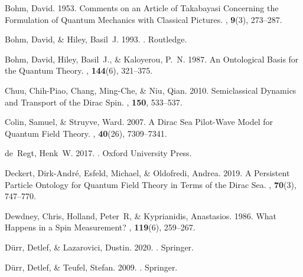 \documentclass[12pt,secnumarabic,amsmath,amssymb,balancelastpage,nofootinbib]{article}
\begin{document}
\begin{thebibliography}{}
Bohm, David. 1953.
\newblock Comments on an Article of Takabayasi Concerning the Formulation of
  Quantum Mechanics with Classical Pictures.
, {\bf 9}(3), 273--287.

Bohm, David, \& Hiley, Basil~J. 1993.
.
\newblock Routledge.

Bohm, David, Hiley, Basil~J., \& Kaloyerou, P.~N. 1987.
\newblock An Ontological Basis for the Quantum Theory.
, {\bf 144}(6), 321--375.

Chuu, Chih-Piao, Chang, Ming-Che, \& Niu, Qian. 2010.
\newblock Semiclassical Dynamics and Transport of the Dirac Spin.
, {\bf 150}, 533--537.

Colin, Samuel, \& Struyve, Ward. 2007.
\newblock A Dirac Sea Pilot-Wave Model for Quantum Field Theory.
, {\bf 40}(26), 7309--7341.

de~Regt, Henk~W. 2017.
.
\newblock Oxford University Press.

Deckert, Dirk-Andr\'{e}, Esfeld, Michael, \& Oldofredi, Andrea. 2019.
\newblock A Persistent Particle Ontology for Quantum Field Theory in Terms of
  the Dirac Sea.
, {\bf 70}(3),
  747--770.

Dewdney, Chris, Holland, Peter~R, \& Kyprianidis, Anastasios. 1986.
\newblock What Happens in a Spin Measurement?
, {\bf 119}(6), 259--267.

D\"{u}rr, Detlef, \& Lazarovici, Dustin. 2020.
.
\newblock Springer.

D\"{u}rr, Detlef, \& Teufel, Stefan. 2009.
.
\newblock Springer.


\end{thebibliography}
\end{document}

